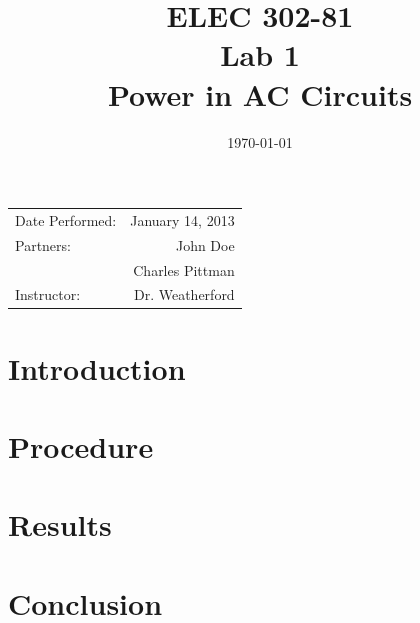 \documentclass{article}
\title{ELEC 302-81\\ Lab 1\\ Power in AC Circuits} %
\date{\today} %
\begin{document}
\maketitle

\begin{center}
  \begin{tabular}{l r}
    Date Performed: & January 14, 2013 \\
    Partners: & John Doe \\
              & Charles Pittman \\
    Instructor: & Dr. Weatherford
  \end{tabular}
\end{center}

\pagebreak

\setlength\parindent{0pt} %

\renewcommand{\labelenumi}{\alph{enumi}.} 

\section{Introduction}

\section{Procedure}

\section{Results}

\section{Conclusion}
\end{document}
